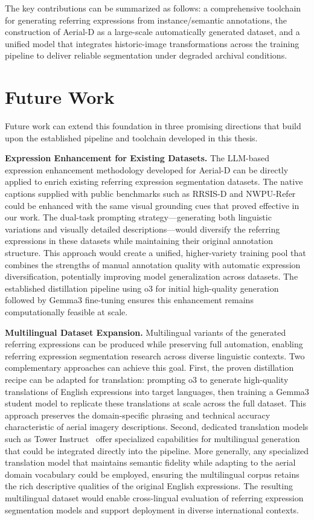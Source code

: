 The key contributions can be summarized as follows: a comprehensive toolchain for generating referring expressions from instance/semantic annotations, the construction of Aerial-D as a large-scale automatically generated dataset, and a unified model that integrates historic-image transformations across the training pipeline to deliver reliable segmentation under degraded archival conditions.

\section{Future Work}

Future work can extend this foundation in three promising directions that build upon the established pipeline and toolchain developed in this thesis.

\textbf{Expression Enhancement for Existing Datasets.} The LLM-based expression enhancement methodology developed for Aerial-D can be directly applied to enrich existing referring expression segmentation datasets. The native captions supplied with public benchmarks such as RRSIS-D and NWPU-Refer could be enhanced with the same visual grounding cues that proved effective in our work. The dual-task prompting strategy—generating both linguistic variations and visually detailed descriptions—would diversify the referring expressions in these datasets while maintaining their original annotation structure. This approach would create a unified, higher-variety training pool that combines the strengths of manual annotation quality with automatic expression diversification, potentially improving model generalization across datasets. The established distillation pipeline using o3 for initial high-quality generation followed by Gemma3 fine-tuning ensures this enhancement remains computationally feasible at scale.

\textbf{Multilingual Dataset Expansion.} Multilingual variants of the generated referring expressions can be produced while preserving full automation, enabling referring expression segmentation research across diverse linguistic contexts. Two complementary approaches can achieve this goal. First, the proven distillation recipe can be adapted for translation: prompting o3 to generate high-quality translations of English expressions into target languages, then training a Gemma3 student model to replicate these translations at scale across the full dataset. This approach preserves the domain-specific phrasing and technical accuracy characteristic of aerial imagery descriptions. Second, dedicated translation models such as Tower Instruct~\cite{towerinstruct} offer specialized capabilities for multilingual generation that could be integrated directly into the pipeline. More generally, any specialized translation model that maintains semantic fidelity while adapting to the aerial domain vocabulary could be employed, ensuring the multilingual corpus retains the rich descriptive qualities of the original English expressions. The resulting multilingual dataset would enable cross-lingual evaluation of referring expression segmentation models and support deployment in diverse international contexts.

